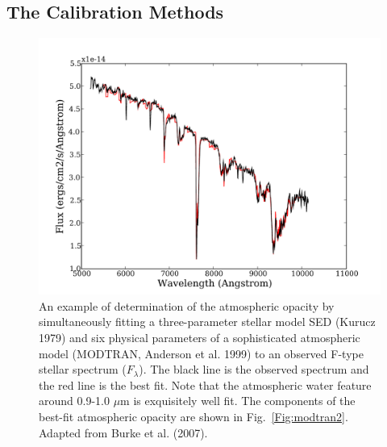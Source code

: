 \documentclass{emulateapj}
\begin{document}
\subsection{ The Calibration Methods }


\begin{figure}
\hskip -0.12in
\includegraphics[width=1.1\hsize,clip]{modtran1.pdf}
\caption{An example of determination of the atmospheric opacity by 
simultaneously fitting a three-parameter stellar model SED (Kurucz 1979) and 
six physical parameters of a sophisticated atmospheric model (MODTRAN, Anderson 
et al. 1999) to an observed F-type stellar spectrum ($F_\lambda$). The black 
line is the observed spectrum and the red line is the best fit. Note that the 
atmospheric water feature around 0.9-1.0 $\mu$m is exquisitely well fit. 
The components of the best-fit atmospheric opacity are shown in 
Fig.~\ref{Fig:modtran2}. Adapted from Burke et al. (2007).}
\label{Fig:modtran1}
\end{figure}
\end{document}
